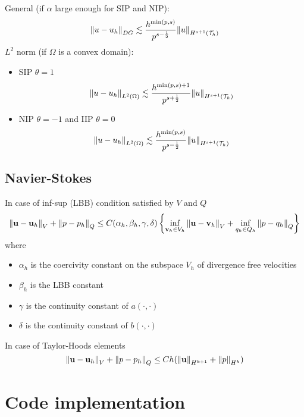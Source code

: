 \documentclass[a4paper,11pt]{article}
\theoremstyle{break}
\newcommand{\vect}[1]{\textbf{#1}}
\newcommand{\ltwonorm}[1]{\norm{#1}_{L^2(\Omega)}}
\newcommand{\triangulation}{\mathcal{T}_h}
\newcommand{\onehalf}{\frac{1}{2}}
\newcommand{\bilinear}{a(\cdot, \cdot)}
\newcommand{\uvec}{\vect{u}}
\newcommand{\vvec}{\vect{v}}
\numberwithin{equation}{section}
\begin{document}
General (if \(\alpha\) large enough for SIP and NIP):
\[
    \norm{u-u_h}_{DG} \lesssim \frac{h^{\min(p,s)}}{p^{s-\onehalf}}\norm{u}_{H^{s+1}(\triangulation)}
\]
\(L^2\) norm (if \(\Omega\) is a convex domain):
\begin{itemize}
    \item SIP \(\theta = 1\)
    \[
        \ltwonorm{u-u_h} \lesssim \frac{h^{\min(p,s)+1}}{p^{s+\onehalf}}\norm{u}_{H^{s+1}(\triangulation)}
    \]
    \item NIP \(\theta = -1\) and IIP \(\theta = 0\)
    \[
        \ltwonorm{u-u_h} \lesssim \frac{h^{\min(p,s)}}{p^{s-\onehalf}}\norm{u}_{H^{s+1}(\triangulation)}
    \]
\end{itemize}
\subsection*{Navier-Stokes}
In case of inf-sup (LBB) condition satisfied by \(V\) and \(Q\)
\[
    \norm{\uvec-\uvec_h}_V + \norm{{p}-{p}_h}_Q \leq C(\alpha_h, \beta_h, \gamma, \delta)\left\{ \inf_{\vvec_h \in V_h}\norm{\uvec-\vvec_h}_V + \inf_{{q}_h \in Q_h}\norm{{p}-{q}_h}_Q \right\}
\]
where 
\begin{itemize}
    \item \(\alpha_h\) is the coercivity constant on the subspace \(V_h\) of divergence free velocities
    \item \(\beta_h\) is the LBB constant 
    \item \(\gamma\) is the continuity constant of \(\bilinear\)
    \item \(\delta\) is the continuity constant of \(b(\cdot,\cdot)\)
\end{itemize}
In case of Taylor-Hoods elements 
\[
    \norm{\uvec-\uvec_h}_V + \norm{{p}-{p}_h}_Q \leq Ch(\norm{\uvec}_{H^{k+1}} + \norm{p}_{H^k})
\]
\section*{Code implementation}
\end{document}
